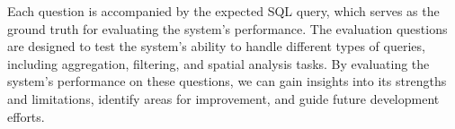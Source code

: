Each question is accompanied by the expected SQL query, which serves as the ground truth for evaluating the system's performance. The evaluation questions are designed to test the system's ability to handle different types of queries, including aggregation, filtering, and spatial analysis tasks. By evaluating the system's performance on these questions, we can gain insights into its strengths and limitations, identify areas for improvement, and guide future development efforts.

{\scriptsize



}
